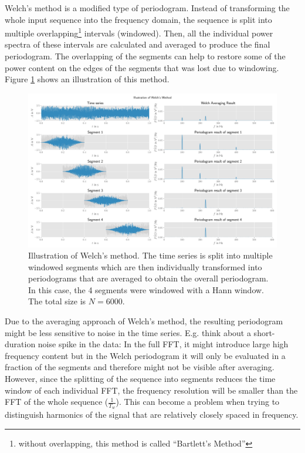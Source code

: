 Welch's method is a modified type of periodogram. Instead of transforming the whole input sequence into the frequency domain, the sequence is split into multiple overlapping\footnote{without overlapping, this method is called ``Bartlett's Method''} intervals (windowed). Then, all the individual power spectra of these intervals are calculated and averaged to produce the final periodogram. The overlapping of the segments can help to restore some of the power content on the edges of the segments that was lost due to windowing. Figure \ref{fig:welch_ill} shows an illustration of this method.\\

\begin{figure}[h]
\centering
\includegraphics[width=\textwidth]{graphics/welch_illustration.pdf}
\caption{Illustration of Welch's method. The time series is split into multiple windowed segments which are then individually transformed into periodograms that are averaged to obtain the overall periodogram. In this case, the 4 segments were windowed with a Hann window. The total size is $N= 6000$.}\label{fig:welch_ill}
\end{figure}

Due to the averaging approach of Welch's method, the resulting periodogram might be less sensitive to noise in the time series. E.g. think about a short-duration noise spike in the data: In the full FFT, it might introduce large high frequency content but in the Welch periodogram it will only be evaluated in a fraction of the segments and therefore might not be visible after averaging.\\

However, since the splitting of the sequence into segments reduces the time window of each individual FFT, the frequency resolution will be smaller than the FFT of the whole sequence ($\frac{1}{T_{w}}$).
This can become a problem when trying to distinguish harmonics of the signal that are relatively closely spaced in frequency.\\

